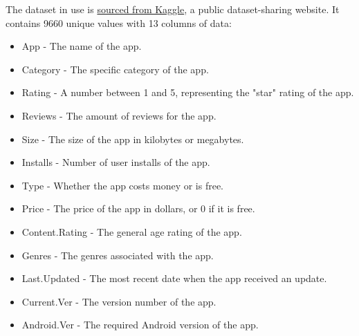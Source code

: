 \documentclass[12pt]{report}\usepackage[]{graphicx}\usepackage[]{xcolor}
\begin{document}
\noindent The dataset in use is \href{https://www.kaggle.com/datasets/lava18/google-play-store-apps/data}{sourced from Kaggle}, a 
public dataset-sharing website. It contains 9660 unique values with 13 columns of data:

\begin{itemize}
    \item App - The name of the app.
    \item Category - The specific category of the app.
    \item Rating - A number between 1 and 5, representing the "star" rating of the app.
    \item Reviews - The amount of reviews for the app.
    \item Size - The size of the app in kilobytes or megabytes.
    \item Installs - Number of user installs of the app.
    \item Type - Whether the app costs money or is free.
    \item Price - The price of the app in dollars, or 0 if it is free.
    \item Content.Rating - The general age rating of the app.
    \item Genres - The genres associated with the app.
    \item Last.Updated - The most recent date when the app received an update.
    \item Current.Ver - The version number of the app.
    \item Android.Ver - The required Android version of the app.
\end{itemize}
\pagebreak
\end{document}
